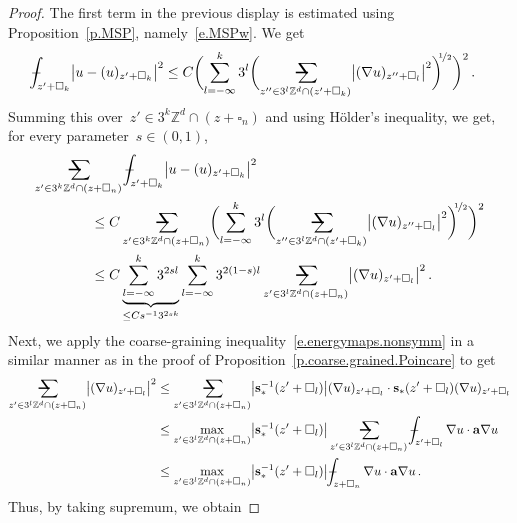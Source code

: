 \documentclass[11pt,twoside]{article} %
\makeatletter
\let\oldsquare\square %
\renewcommand{\square}{\oldsquare}
\numberwithin{equation}{section}
\theoremstyle{definition}
\newcommand*{\Zd}{\ensuremath{\mathbb{Z}^d}}
\newcommand{\s}{\mathbf{s}}
\renewcommand{\a}{\mathbf{a}}
\newcommand{\cu}{\square}
\newcommand{\avsum}{\mathop{\mathpalette\avsuminner\relax}\displaylimits}
\newcommand\avsuminner[2]{%
  {\sbox0{$\m@th#1\sum$}%
   \vphantom{\usebox0}%
   \ooalign{%
     \hidewidth
     \smash{\,\rule[.23em]{8.8pt}{1.1pt} \relax}%
     \hidewidth\cr
   ~$\m@th#1\sum$\cr
   }%
  }%
}
\def\Xint#1{\mathchoice
{\XXint\displaystyle\textstyle{#1}}%
{\XXint\textstyle\scriptstyle{#1}}%
{\XXint\scriptstyle\scriptscriptstyle{#1}}%
{\XXint\scriptscriptstyle\scriptscriptstyle{#1}}%
\!\int}
\def\XXint#1#2#3{{\setbox0=\hbox{$#1{#2#3}{\int}$}
\vcenter{\hbox{$#2#3$}}\kern-.5\wd0}}
\def\fint{\Xint-}
\makeatother
\begin{document}
\begin{proof}
The first term in the previous display is estimated using Proposition~\ref{p.MSP}, namely~\eqref{e.MSPw}. We get 
\begin{align*}
\fint_{z'+\cu_k} 
\bigl| u  -
(u )_{z'+\cu_{k}} \bigr|^2 
&
\leq 
C\biggl(  \sum_{l=-\infty}^{{k}} 3^{l} 
\biggl( 
\avsum_{z''\in 3^l\Zd\cap (z'+\cu_{k})} 
\bigl|  ( \nabla u   )_{z''+\cu_l} \bigr|^2
\biggr)^{\!\!\nicefrac12}\biggr)^2
\,.
\end{align*}
Summing this over~$z'\in 3^k\Zd \cap (z+\cu_n)$ and using H\"older's inequality, we get, for every parameter~$s \in (0,1)$, 
\begin{align*}
\lefteqn{ 
\avsum_{z'\in 3^k\Zd\cap (z+\cu_n)}
\fint_{z'+\cu_k}
\bigl| u   -
(u  )_{z'+\cu_{k}} \bigr|^2 
} \qquad \qquad & 
\notag \\ & 
\leq 
C \avsum_{z'\in 3^k\Zd\cap (z+\cu_n)}
\biggl(  \sum_{l=-\infty}^{{k}} 3^{l} 
\biggl( 
\avsum_{z''\in 3^l\Zd\cap (z'+\cu_{k})} 
\bigl|  ( \nabla u )_{z''+\cu_l} \bigr|^2
\biggr)^{\!\!\nicefrac12}\biggr)^2
\notag \\ & 
\leq 
C
\underbrace{
\sum_{l=-\infty}^k
3^{2sl}
}_{
\leq Cs^{-1}3^{2sk} 
}
\sum_{l=-\infty}^k 
3^{2(1-s)l} 
\avsum_{z'\in 3^l\Zd\cap (z+\cu_{n})} 
\bigl|  ( \nabla u )_{z'+\cu_l} \bigr|^2
\,.
\end{align*}
Next, we apply the coarse-graining inequality~\eqref{e.energymaps.nonsymm} in a similar manner as in the proof of Proposition~\ref{p.coarse.grained.Poincare} to get 
\begin{align*}
\avsum_{z'\in 3^l\Zd\cap (z+\cu_{n})} 
\bigl|  ( \nabla u   )_{z'+\cu_l} \bigr|^2
&
\leq 
\avsum_{z'\in 3^l\Zd\cap (z+\cu_{n})} 
\bigl| \s_*^{-1}(z'+\cu_l) \bigr|  
( \nabla u   )_{z'+\cu_l} 
\cdot
\s_*(z'+\cu_l) 
( \nabla u   )_{z'+\cu_l} 
\notag \\ & 
\leq 
\max_{z'\in 3^l\Zd\cap (z+\cu_{n})}
\bigl| \s_*^{-1}(z'+\cu_l) \bigr|  
\avsum_{z'\in 3^l\Zd\cap (z+\cu_{n})} 
\fint_{z'+\cu_l}  \nabla u \cdot \a\nabla u
\notag \\ & 
\leq 
\max_{z'\in 3^l\Zd\cap (z+\cu_{n})}
\bigl| \s_*^{-1}(z'+\cu_l) \bigr| 
\fint_{z+\cu_n} 
\nabla u \cdot \a\nabla u
\,.
\end{align*}
Thus, by taking supremum, we obtain 

\end{proof}
\end{document}

